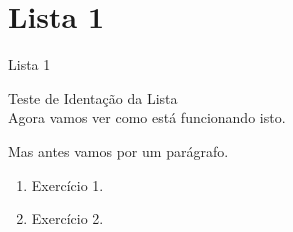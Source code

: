 \makeatletter
\renewcommand{\@chapapp}{Exercicios}
\makeatother
%
\chapter{Lista 1}{Lista 1}
\chaptermark{}




Teste de Identação da Lista
\\
Agora vamos ver como está funcionando isto.

Mas antes vamos por um parágrafo.

\begin{enumerate}[leftmargin=*]

\item 
Exercício 1. 


\item 
Exercício 2.


\end{enumerate}





\makeatletter
\renewcommand{\@chapapp}{Aula}
\makeatother



